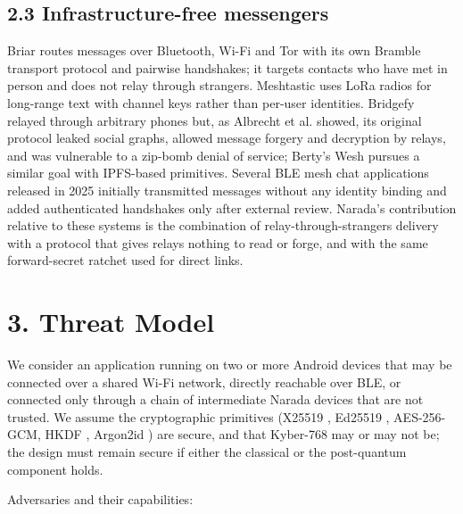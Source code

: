 \documentclass[conference]{IEEEtran}
\begin{document}
\subsection{2.3 Infrastructure-free messengers}
Briar \cite{ref11} routes messages over Bluetooth, Wi-Fi and Tor with its own Bramble transport protocol and pairwise handshakes; it targets contacts who have met in person and does not relay through strangers. Meshtastic \cite{ref12} uses LoRa radios for long-range text with channel keys rather than per-user identities. Bridgefy \cite{ref6} relayed through arbitrary phones but, as Albrecht et al. showed, its original protocol leaked social graphs, allowed message forgery and decryption by relays, and was vulnerable to a zip-bomb denial of service; Berty's Wesh \cite{ref20} pursues a similar goal with IPFS-based primitives. Several BLE mesh chat applications released in 2025 initially transmitted messages without any identity binding and added authenticated handshakes only after external review. Narada's contribution relative to these systems is the combination of relay-through-strangers delivery with a protocol that gives relays nothing to read or forge, and with the same forward-secret ratchet used for direct links.

\section{3. Threat Model}
We consider an application running on two or more Android devices that may be connected over a shared Wi-Fi network, directly reachable over BLE, or connected only through a chain of intermediate Narada devices that are not trusted. We assume the cryptographic primitives (X25519 \cite{ref17}, Ed25519 \cite{ref22}, AES-256-GCM, HKDF \cite{ref16}, Argon2id \cite{ref15}) are secure, and that Kyber-768 \cite{ref21} may or may not be; the design must remain secure if either the classical or the post-quantum component holds.

Adversaries and their capabilities:
\end{document}
